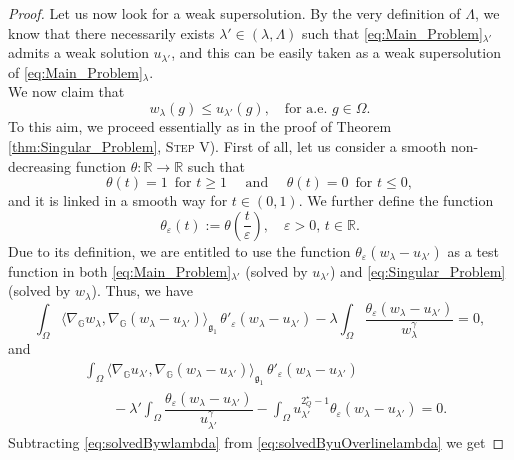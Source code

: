 \documentclass[11pt]{amsart}
\numberwithin{equation}{section} %
\theoremstyle{definition}
\begin{document}
\begin{proof}
	Let us now look for a weak supersolution. By the very definition of $\Lambda$, we know that there necessarily exists $\lambda' \in (\lambda, \Lambda)$ such that \eqref{eq:Main_Problem}$_{\lambda'}$ admits a weak solution $u_{\lambda'}$, and this can be easily taken as a weak supersolution of \eqref{eq:Main_Problem}$_{\lambda}$.\\
	We now claim that
	\begin{equation}\label{eq:Claim}
		w_{\lambda}(g) \leq u_{\lambda'}(g), \quad \textrm{for a.e. } g\in \Omega.
	\end{equation}
	To this aim, we proceed essentially as in the proof
	of Theorem \ref{thm:Singular_Problem}, \textsc{Step V).} First of all, let us consider a smooth non-decreasing function $\theta: \mathbb{R}\to \mathbb{R}$ such that
	$$\theta(t) =1 \, \textrm{ for } t \geq 1 \quad \textrm{ and } \quad \theta(t) = 0 \, \textrm{ for } t \leq 0,$$
	\noindent and it is linked in a smooth way for $t \in (0,1)$. We further define the function
	$$\theta_{\varepsilon}(t):= \theta \left(\dfrac{t}{\varepsilon}\right), \quad \varepsilon>0, \, t\in \mathbb{R}.$$
	Due to its definition, we are entitled to use the function $\theta_{\varepsilon}(w_{\lambda}- u_{\lambda'})$ as a test function in both \eqref{eq:Main_Problem}$_{\lambda'}$ (solved by $u_{\lambda'}$) and \eqref{eq:Singular_Problem} (solved by $w_{\lambda}$). Thus, we have
	\begin{equation}\label{eq:solvedBywlambda}
			\int_{\Omega}\langle\nabla_{\mathbb{G}} w_{\lambda}, \nabla_{\mathbb{G}}(w_{\lambda}-u_{\lambda'})\rangle_{\mathfrak{g}_{1}} \, \theta'_{\varepsilon}(w_{\lambda}-u_{\lambda'})
			- \lambda \int_{\Omega}\dfrac{\theta_{\varepsilon}(w_{\lambda}-u_{\lambda'})}{w_{\lambda}^{\gamma}} = 0,
	\end{equation}
	\noindent and
	\begin{equation}\label{eq:solvedByuOverlinelambda}
		\begin{aligned}
			&\int_{\Omega}\langle\nabla_{\mathbb{G}} u_{\lambda'}, \nabla_{\mathbb{G}}(w_{\lambda}-u_{\lambda'})\rangle_{\mathfrak{g}_{1}}\, \theta'_{\varepsilon}(w_{\lambda}-u_{\lambda'})\\
			& \qquad - \lambda' \int_{\Omega}\dfrac{\theta_{\varepsilon}(w_{\lambda}-u_{\lambda'})}{u_{\lambda'}^{\gamma}} - \int_{\Omega}u_{\lambda'}^{2^{\star}_{Q}-1}\theta_{\varepsilon}(w_{\lambda}-u_{\lambda'}) = 0.
		\end{aligned}
	\end{equation}
	Subtracting \eqref{eq:solvedBywlambda} from  \eqref{eq:solvedByuOverlinelambda} we get

\end{proof}
\end{document}
